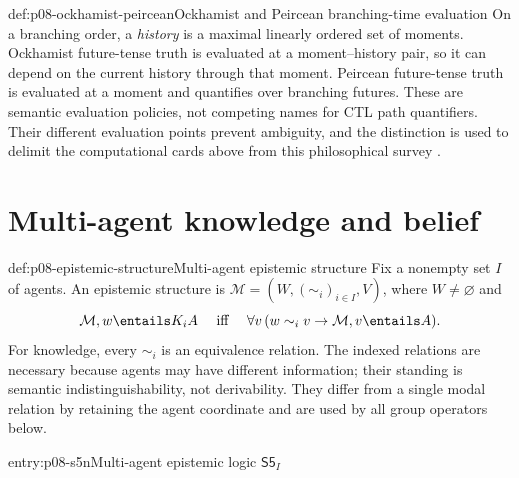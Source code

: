 \begin{hbdefinition}{def:p08-ockhamist-peircean}{Ockhamist and Peircean branching-time evaluation}
On a branching order, a \emph{history} is a maximal linearly ordered set of
moments.  Ockhamist future-tense truth is evaluated at a moment--history pair,
so it can depend on the current history through that moment.  Peircean
future-tense truth is evaluated at a moment and quantifies over branching
futures.  These are semantic evaluation policies, not competing names for CTL
path quantifiers.  Their different evaluation points prevent ambiguity, and
the distinction is used to delimit the computational cards above from this
philosophical survey \cite{Burgess1984}.
\end{hbdefinition}

\section{Multi-agent knowledge and belief}

\begin{hbdefinition}{def:p08-epistemic-structure}{Multi-agent epistemic structure}
Fix a nonempty set \(I\) of agents.  An epistemic structure is
\(\mathcal M=(W,(\sim_i)_{i\in I},V)\), where \(W\ne\varnothing\) and
\[
 \mathcal M,w\entails K_iA
 \quad\text{ iff }\quad
 \forall v\,(w\sim_i v\to\mathcal M,v\entails A).
\]
For knowledge, every \(\sim_i\) is an equivalence relation.  The indexed
relations are necessary because agents may have different information; their
standing is semantic indistinguishability, not derivability.  They differ from
a single modal relation by retaining the agent coordinate and are used by all
group operators below.
\end{hbdefinition}

\begin{systementry}{entry:p08-s5n}{Multi-agent epistemic logic \(\mathsf{S5}_{I}\)}
\end{systementry}

